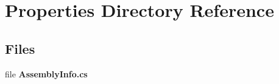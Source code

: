 \section{Properties Directory Reference}
\label{dir_d051c76eebdc544d9c3d734575641c72}
\subsection*{Files}
\begin{DoxyCompactItemize}
\item 
file {\bfseries Assembly\-Info.\-cs}
\end{DoxyCompactItemize}
